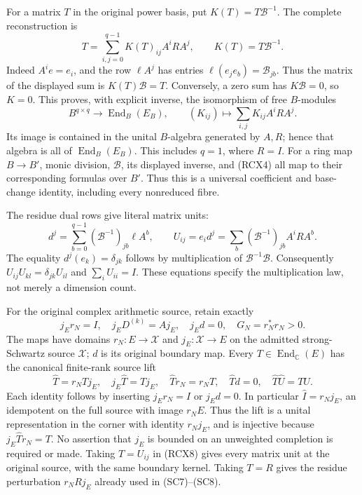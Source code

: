 For a matrix \(T\) in the original power basis, put
\(K(T)=T\mathcal B^{-1}\). The complete reconstruction is
\[
 \boxed{
 T=\sum_{i,j=0}^{q-1}K(T)_{ij}A^iRA^j,\qquad
 K(T)=T\mathcal B^{-1}.}
 \tag{RCX4}
\]
Indeed \(A^ie=e_i\), and the row \(\ell A^j\) has entries
\(\ell(e_je_b)=\mathcal B_{jb}\). Thus the matrix of the displayed
sum is \(K(T)\mathcal B=T\). Conversely, a zero sum has
\(K\mathcal B=0\), so \(K=0\). This proves, with explicit inverse,
the isomorphism of free \(B\)-modules
\[
 B^{q\times q}\longrightarrow\operatorname{End}_B(E_B),
 \qquad (K_{ij})\longmapsto\sum_{i,j}K_{ij}A^iRA^j.
 \tag{RCX5}
\]
Its image is contained in the unital \(B\)-algebra generated by \(A,R\);
hence that algebra is all of \(\operatorname{End}_B(E_B)\).
This includes \(q=1\), where \(R=I\). For a ring map \(B\to B'\),
monic division, \(\mathcal B\), its displayed inverse, and (RCX4)
all map to their corresponding formulas over \(B'\). Thus this is
a universal coefficient and base-change identity, including every
nonreduced fibre.

The residue dual rows give literal matrix units:
\[
 d^j=\sum_{b=0}^{q-1}(\mathcal B^{-1})_{jb}\ell A^b,\qquad
 U_{ij}=e_i d^j
       =\sum_b(\mathcal B^{-1})_{jb}A^iRA^b.
 \tag{RCX6}
\]
The equality \(d^j(e_k)=\delta_{jk}\) follows by multiplication of
\(\mathcal B^{-1}\mathcal B\). Consequently
\(U_{ij}U_{kl}=\delta_{jk}U_{il}\) and
\(\sum_iU_{ii}=I\). These equations specify the multiplication law,
not merely a dimension count.

For the original complex arithmetic source, retain exactly
\[
 j_Er_N=I,\quad j_ED^{(k)}=Aj_E,\quad j_Ed=0,\quad
 G_N=r_N^*r_N>0.
 \tag{RCX7}
\]
The maps have domains \(r_N:E\to\mathscr X\) and
\(j_E:\mathscr X\to E\) on the admitted strong-Schwartz source
\(\mathscr X\); \(d\) is its original boundary map. Every
\(T\in\operatorname{End}_{\mathbb C}(E)\) has the canonical finite-rank
source lift
\[
 \widehat T=r_NTj_E,\quad
 j_E\widehat T=Tj_E,\quad
 \widehat T r_N=r_NT,\quad
 \widehat T d=0,\quad
 \widehat T\widehat U=\widehat{TU}.
 \tag{RCX8}
\]
Each identity follows by inserting \(j_Er_N=I\) or \(j_Ed=0\).
In particular \(\widehat I=r_Nj_E\), an idempotent on the full
source with image \(r_NE\). Thus the lift is a unital representation
in the corner with identity \(r_Nj_E\), and is injective because
\(j_E\widehat T r_N=T\). No assertion that \(j_E\) is bounded on
an unweighted completion is required or made. Taking \(T=U_{ij}\)
in (RCX8) gives every matrix unit at the original source, with the
same boundary kernel. Taking \(T=R\) gives the residue perturbation
\(r_NRj_E\) already used in (SC7)--(SC8).

